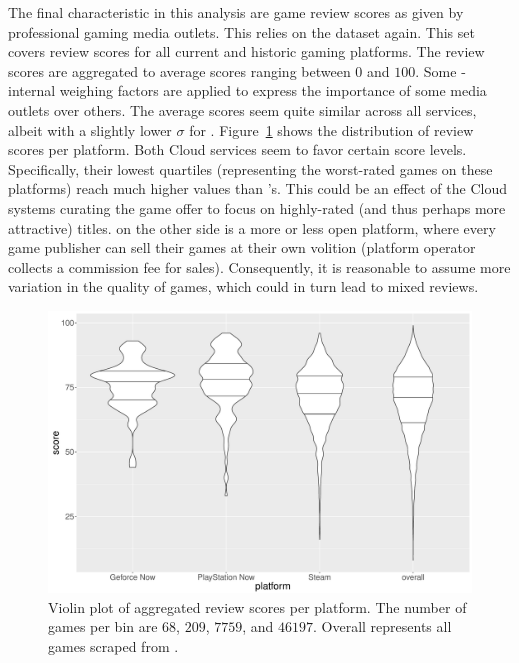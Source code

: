 The final characteristic in this analysis are game review scores as given by professional gaming media outlets. This relies on the \metacritic dataset again. This set covers review scores for all current and historic gaming platforms. The review scores are aggregated to average scores ranging between $0$ and $100$. Some \metacritic-internal weighing factors are applied to express the importance of some media outlets over others.
The average scores seem quite similar across all services, albeit with a slightly lower $\sigma$ for \gfnow. Figure~\ref{fig:scores-by-platform} shows the distribution of review scores per platform. Both Cloud services seem to favor certain score levels. Specifically, their lowest quartiles (representing the worst-rated games on these platforms) reach much higher values than \steam's. This could be an effect of the Cloud systems curating the game offer to focus on highly-rated (and thus perhaps more attractive) titles. \steam on the other side is a more or less open platform, where every game publisher can sell their games at their own volition (platform operator collects a commission fee for sales). Consequently, it is reasonable to assume more variation in the quality of games, which could in turn lead to mixed reviews.

\begin{figure}[!t]
	\centering
	\includegraphics[width=1.0\columnwidth]{images/scores-by-platform-violin.pdf}
	\caption{Violin plot of aggregated review scores per platform. The number of games per bin are $68$, $209$, $7759$, and $46197$. Overall represents all games scraped from \metacritic.}
\label{fig:scores-by-platform}
\end{figure}

